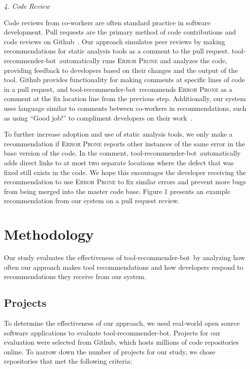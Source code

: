 \documentclass[conference]{IEEEtran}
\newcommand{\tool}{tool-recommender-bot}
\newcommand{\pseudosubsection}[1]{\vspace{2mm} {\it #1}}
\begin{document}
\pseudosubsection{4. Code Review}

Code reviews from co-workers are often standard practice in software development. Pull requests are the primary method of code contributions and code reviews on Github~\cite{PullRequestReview}. Our approach simulates peer reviews by making recommendations for static analysis tools as a comment to the pull request. \tool~automatically runs \textsc{Error Prone} and analyzes the code, providing feedback to developers based on their changes and the output of the tool. Github provides functionality for making comments at specific lines of code in a pull request, and \tool~recommends \textsc{Error Prone} as a comment at the fix location line from the previous step. Additionally, our system  uses language similar to comments between co-workers in recommendations, such as using ``Good job!'' to compliment developers on their work~\cite{?}.

To further increase adoption and use of static analysis tools, we only make a recommendation if \textsc{Error Prone} reports other instances of the same error in the base version of the code. In the comment, \tool~automatically adds direct links to at most two separate locations where the defect that was fixed still exists in the code. We hope this encourages the developer receiving the recommendation to use \textsc{Error Prone} to fix similar errors and prevent more bugs from being merged into the master code base. Figure 1 presents an example recommendation from our system on a pull request review.

\section{Methodology}

Our study evaluates the effectiveness of \tool~by analyzing how often our approach makes tool recommendations and how developers respond to recommendations they receive from our system.

\subsection{Projects}

To determine the effectiveness of our approach, we used real-world open source software applications to evaluate \tool. Projects for our evaluation were selected from Github, which hosts millions of code repositories online. To narrow down the number of projects for our study, we chose repositories that met the following criteria:
\end{document}
